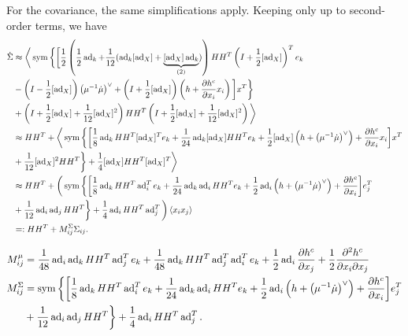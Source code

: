 \documentclass[12pt,class=article,crop=false]{standalone}
\begin{document}
For the covariance, the same simplifications apply. Keeping only up to second-order terms, we have
\begin{align*}
	\dot{ \Sigma} & \approx \bigg\langle \operatorname{sym} \bigg\{ \bigg[ \frac{1}{2} \left( \frac{1}{2} \operatorname{ad}_{ k} + \frac{1}{12} ( \operatorname{ad}_{ k} [ \operatorname{ad}_{ X}] + \underbrace{ [ \operatorname{ad}_{ X}] \operatorname{ad}_{ k}}_{(2)}) \right) HH^{T} \left( I + \frac{1}{2} [ \operatorname{ad}_{ X}] \right)^{T} e_k  \\ 
		      &- \left( I- \frac{1}{2} [ \operatorname{ad}_{ X}] \right) \left( \mu^{-1} \dot{\mu} \right)^\vee + \left( I + \frac{1}{2} [ \operatorname{ad}_{ X}] \right) \left( h + \frac{\partial h^{c}}{\partial x_i} x_i \right)   \bigg] x^{T}  \bigg\} \\
		      &+  \left( I+ \frac{1}{2} [ \operatorname{ad}_{ X}] + \frac{1}{12} [ \operatorname{ad}_{ X}]^2 \right) HH^{T} \left( I+ \frac{1}{2} [ \operatorname{ad}_{ X}] + \frac{1}{12} [ \operatorname{ad}_{ X}]^2 \right) \bigg\rangle \\ 
		      &\approx HH^{T} + \bigg\langle \operatorname{sym} \bigg\{ \bigg[ \frac{1}{8} \operatorname{ad}_{ k} HH^{T} [ \operatorname{ad}_{ X}]^{T} e_k + \frac{1}{24} \operatorname{ad}_{ k} [ \operatorname{ad}_{ X}]HH^{T} e_k + \frac{1}{2} [ \operatorname{ad}_{ X}] \left( h + \left( \mu^{-1} \dot{\mu} \right)^\vee  \right) + \frac{\partial h^{c}}{\partial x_i} x_i \bigg] x^{T} \\ 
	&+ \frac{1}{12} [ \operatorname{ad}_{ X}]^2 HH^{T} \bigg\} + \frac{1}{4} [ \operatorname{ad}_{ X}] H H^{T} [\operatorname{ad}_{ X}]^{T} \bigg\rangle \\
		      &\approx  HH^{T} + \bigg( \operatorname{sym} \bigg\{ \bigg[ \frac{1}{8} \operatorname{ad}_{ k} HH^{T}  \operatorname{ad}_i^{T} e_k + \frac{1}{24} \operatorname{ad}_{ k} \operatorname{ad}_i HH^{T} e_k + \frac{1}{2} \operatorname{ad}_{ i} \left( h + \left( \mu^{-1} \dot{\mu} \right)^\vee  \right) + \frac{\partial h^{c}}{\partial x_i} \bigg] e_j^{T} \\ 
	&+ \frac{1}{12} \operatorname{ad}_{ i} \operatorname{ad}_{ j} HH^{T} \bigg\} + \frac{1}{4} \operatorname{ad}_{ i} H H^{T} \operatorname{ad}_{ j}^{T} \bigg) \left\langle x_i x_j \right\rangle \\
	&=: HH^{T} + M^{ \Sigma}_{ij} \Sigma_{ij} .
\end{align*}

\begin{align*}
	M_{ij}^{\mu} &= \frac{1}{48} \operatorname{ad}_i \operatorname{ad}_k HH^{T} \operatorname{ad}_{ j} ^{T} e_k + \frac{1}{48} \operatorname{ad}_{ k} HH^{T} \operatorname{ad}_j ^{T} \operatorname{ad}_{ i}^{T} e_k + \frac{1}{2} \operatorname{ad}_{ i} \frac{\partial h^{c}}{\partial x_j} + \frac{1}{2} \frac{\partial^2 h^{c}}{\partial { x_i} \partial x_j}    \\
	M_{ij}^{ \Sigma} &= \operatorname{sym} \bigg\{ \bigg[ \frac{1}{8} \operatorname{ad}_{ k} HH^{T}  \operatorname{ad}_i^{T} e_k + \frac{1}{24} \operatorname{ad}_{ k} \operatorname{ad}_i HH^{T} e_k + \frac{1}{2} \operatorname{ad}_{ i} \left( h + \left( \mu^{-1} \dot{\mu} \right)^\vee  \right) + \frac{\partial h^{c}}{\partial x_i} \bigg] e_j^{T} \\ 
	&+ \frac{1}{12} \operatorname{ad}_{ i} \operatorname{ad}_{ j} HH^{T} \bigg\} + \frac{1}{4} \operatorname{ad}_{ i} H H^{T} \operatorname{ad}_{ j}^{T} .
\end{align*}
\end{document}
